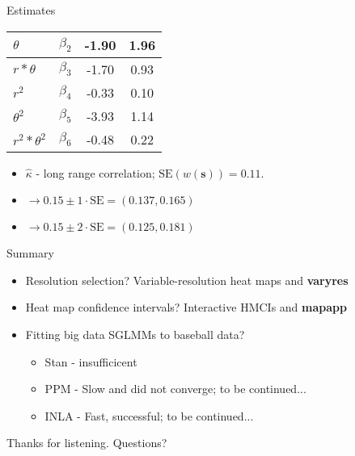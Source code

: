 \documentclass{beamer}
\begin{document}
\begin{frame}{Estimates}
\begin{table}
{\begin{tabular}{| l | c | c | c |}
$\theta$          & $\beta_{2}$ & -1.90 & 1.96 \\ \hline
$r*\theta$        & $\beta_{3}$ & -1.70 & 0.93 \\ \hline
$r^{2}$           & $\beta_{4}$ & -0.33 & 0.10 \\ \hline
$\theta^{2}$      & $\beta_{5}$ & -3.93 & 1.14 \\ \hline
$r^{2}*\theta^{2}$& $\beta_{6}$ & -0.48 & 0.22 \\ \hline
\end{tabular}
}
\end{table}
\begin{itemize}
\item $\hat{\kappa}$ - long range correlation; $\text{SE}(w(\pmb{s})) = 0.11$.
\item $\rightarrow 0.15 \pm 1 \cdot \text{SE} = (0.137, 0.165)$
\item $\rightarrow 0.15 \pm 2 \cdot \text{SE} = (0.125, 0.181)$
\end{itemize}
\end{frame}

\begin{frame}{Summary}
\begin{itemize}
\addtolength{\itemsep}{0.5\baselineskip}
\item Resolution selection? Variable-resolution heat maps and {\bf varyres}
\item Heat map confidence intervals? Interactive HMCIs and {\bf mapapp}
\item Fitting big data SGLMMs to baseball data?
  \begin{itemize}
  \addtolength{\itemsep}{0.5\baselineskip}
  \item Stan - insufficicent
  \item PPM - Slow and did not converge; to be continued...
  \item INLA - Fast, successful; to be continued...
  \end{itemize}
\end{itemize}
\end{frame}


%
%
%
\begin{frame}{}
\begin{center}
\Huge{Thanks for listening.
Questions?}
\end{center}
\end{frame}


\end{document}
